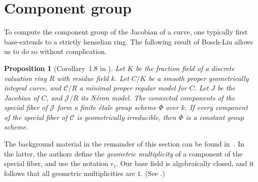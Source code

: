 \documentclass[pagesize,paper=letter]{scrartcl}
\newcommand{\scd}{\mathscr{C}}
\newcommand{\sj}{\mathscr{J}}
\theoremstyle{plain}
\newtheorem{proposition}[theorem]{Proposition}
\theoremstyle{definition}
\theoremstyle{remark}
\begin{document}
\section{Component group}
\label{sec:component-group}

To compute the component group of the Jacobian of a curve, one typically first base-extends to a strictly henselian ring. The following result of Bosch-Liu allows us to do so without complication.

\begin{proposition}[Corollary~1.8 in \cite{bosch-liu1999}]\label{prop:bosch-liu-phi-constant}
  Let $K$ be the fraction field of a discrete valuation ring $R$ with residue field $k$. Let $C/K$ be a smooth proper geometrically integral curve, and $\scd/R$ a minimal proper regular model for $C$. Let $J$ be the Jacobian of $C$, and $\sj/R$ its N\'eron model. The connected components of the special fiber of $\sj$ form a finite \'etale group scheme $\Phi$ over $k$. If every component of the special fiber of $\scd$ is geometrically irreducible, then $\Phi$ is a constant group scheme.
\end{proposition}

The background material in the remainder of this section can be found in~\cite[Ch. 9]{blr}. In the latter, the authors define the \emph{geometric multiplicity} of a component of the special fiber, and use the notation $e_i$. Our base field is algebraically closed, and it follows that all geometric multiplicities are $1$. (See \cite[Defn~9.1.3]{blr}.)
\end{document}
